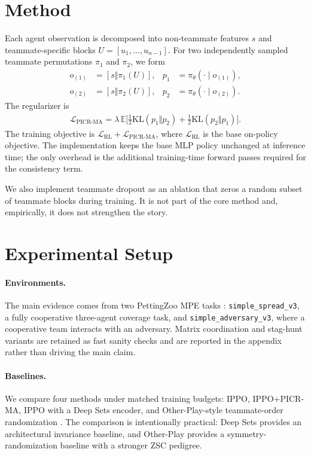 \documentclass{article}
\newcommand{\method}{PICR-MA}
\newcommand{\KL}{\mathrm{KL}}
\newcommand{\E}{\mathbb{E}}
\begin{document}
\section{Method}
Each agent observation is decomposed into non-teammate features $s$ and teammate-specific blocks $U = [u_1,\dots,u_{n-1}]$. For two independently sampled teammate permutations $\pi_1$ and $\pi_2$, we form
\begin{align}
o_{(1)} &= [s \Vert \pi_1(U)], &
p_1 &= \pi_\theta(\cdot \mid o_{(1)}), \\
o_{(2)} &= [s \Vert \pi_2(U)], &
p_2 &= \pi_\theta(\cdot \mid o_{(2)}).
\end{align}
The regularizer is
\begin{align}
\mathcal{L}_{\text{\method}} =
\lambda \, \E \Big[
\tfrac{1}{2}\KL(p_1 \Vert p_2) +
\tfrac{1}{2}\KL(p_2 \Vert p_1)
\Big].
\end{align}
The training objective is $\mathcal{L}_{\text{RL}} + \mathcal{L}_{\text{\method}}$, where $\mathcal{L}_{\text{RL}}$ is the base on-policy objective. The implementation keeps the base MLP policy unchanged at inference time; the only overhead is the additional training-time forward passes required for the consistency term.

We also implement teammate dropout as an ablation that zeros a random subset of teammate blocks during training. It is not part of the core method and, empirically, it does not strengthen the story.

\section{Experimental Setup}
\paragraph{Environments.}
The main evidence comes from two PettingZoo MPE tasks \citep{terry2021pettingzoo}: \texttt{simple\_spread\_v3}, a fully cooperative three-agent coverage task, and \texttt{simple\_adversary\_v3}, where a cooperative team interacts with an adversary. Matrix coordination and stag-hunt variants are retained as fast sanity checks and are reported in the appendix rather than driving the main claim.

\paragraph{Baselines.}
We compare four methods under matched training budgets: IPPO, IPPO+\method, IPPO with a Deep Sets encoder, and Other-Play-style teammate-order randomization \citep{schulman2017ppo, terry2020ps, zaheer2017deepsets, hu2020otherplay}. The comparison is intentionally practical: Deep Sets provides an architectural invariance baseline, and Other-Play provides a symmetry-randomization baseline with a stronger ZSC pedigree.
\end{document}
